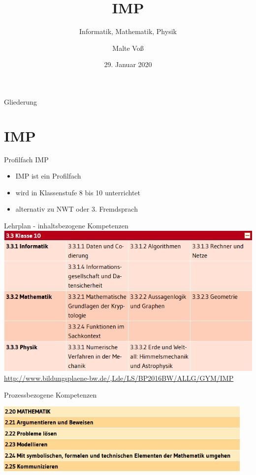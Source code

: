 \documentclass[18pt]{beamer}
\title[IMP]{IMP}
\subtitle{Informatik, Mathematik, Physik}
\author{Malte Vo\ss}
\institute{Abteilung für Didaktik der Mathematik}
\date{29. Januar 2020}
\begin{document}

\begin{frame}
\titlepage
\end{frame}

\begin{frame}{Gliederung}
\tableofcontents
\end{frame}

\section{IMP}
    \begin{frame}{Profilfach IMP}
        \begin{itemize}[<+->]
            \item IMP ist ein Profilfach
            \item wird in Klassenstufe 8 bis 10 unterrichtet
            \item alternativ zu NWT oder 3. Fremdsprach
        \end{itemize}
    \end{frame}

    \begin{frame}{Lehrplan - inhaltsbezogene Kompetenzen}
        \includegraphics[keepaspectratio, width=\textwidth]{figures/IMP_10}
        \cite{bildungsp}
        \tiny\url{http://www.bildungsplaene-bw.de/,Lde/LS/BP2016BW/ALLG/GYM/IMP}
    \end{frame}

    \begin{frame}{Prozessbezogene Kompetenzen}
    
        \includegraphics[keepaspectratio, width=0.95\textwidth]{figures/IMP_Prozess.png}
        \cite{bildungsp}
        \pause

    \end{frame}
        
\end{document}
